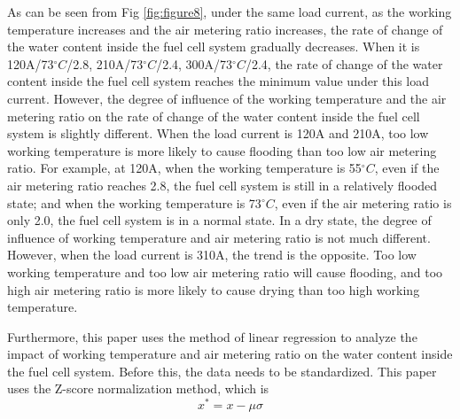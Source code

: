 As can be seen from Fig \ref{fig:figure8}, under the same load current, as the working temperature increases and the air metering ratio increases, the rate of change of the water content inside the fuel cell system gradually decreases. When it is 120A/73$^{\circ}C$/2.8, 210A/73$^{\circ}C$/2.4, 300A/73$^{\circ}C$/2.4, the rate of change of the water content inside the fuel cell system reaches the minimum value under this load current. However, the degree of influence of the working temperature and the air metering ratio on the rate of change of the water content inside the fuel cell system is slightly different. When the load current is 120A and 210A, too low working temperature is more likely to cause flooding than too low air metering ratio. For example, at 120A, when the working temperature is 55$^{\circ}C$, even if the air metering ratio reaches 2.8, the fuel cell system is still in a relatively flooded state; and when the working temperature is 73$^{\circ}C$, even if the air metering ratio is only 2.0, the fuel cell system is in a normal state. In a dry state, the degree of influence of working temperature and air metering ratio is not much different. However, when the load current is 310A, the trend is the opposite. Too low working temperature and too low air metering ratio will cause flooding, and too high air metering ratio is more likely to cause drying than too high working temperature.
\par
Furthermore, this paper uses the method of linear regression to analyze the impact of working temperature and air metering ratio on the water content inside the fuel cell system. Before this, the data needs to be standardized. This paper uses the Z-score normalization method\cite{altman2013predicting,camska2013predicting}, which is
$$x^{*}=x-\mu\sigma$$

